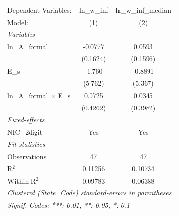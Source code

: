 
\begingroup
\centering
\begin{tabular}{lcc}
   \tabularnewline \midrule \midrule
   Dependent Variables:            & ln\_w\_inf   & ln\_w\_inf\_median\\     
   Model:                          & (1)          & (2)\\  
   \midrule
   \emph{Variables}\\
   ln\_A\_formal                   & -0.0777      & 0.0593\\   
                                   & (0.1624)     & (0.1596)\\   
   E\_s                            & -1.760       & -0.8891\\   
                                   & (5.762)      & (5.367)\\   
   ln\_A\_formal $\times$ E\_s     & 0.0725       & 0.0345\\   
                                   & (0.4262)     & (0.3982)\\   
   \midrule
   \emph{Fixed-effects}\\
   NIC\_2digit                     & Yes          & Yes\\  
   \midrule
   \emph{Fit statistics}\\
   Observations                    & 47           & 47\\  
   R$^2$                           & 0.11256      & 0.10734\\  
   Within R$^2$                    & 0.09783      & 0.06388\\  
   \midrule \midrule
   \multicolumn{3}{l}{\emph{Clustered (State\_Code) standard-errors in parentheses}}\\
   \multicolumn{3}{l}{\emph{Signif. Codes: ***: 0.01, **: 0.05, *: 0.1}}\\
\end{tabular}
\par\endgroup


